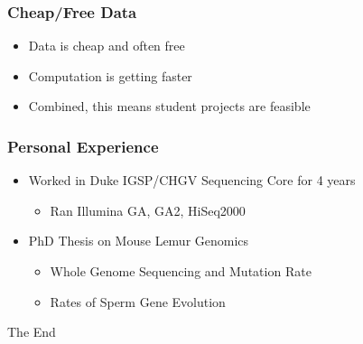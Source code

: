 \documentclass[14pt]{beamer}
\begin{document}
\begin{frame}
\frametitle{Cheap/Free Data}
\begin{itemize}
	\item Data is cheap and often free
	\item Computation is getting faster
	\item Combined, this means student projects are feasible
\end{itemize}
\end{frame}
\begin{frame}
\frametitle{Personal Experience}
\begin{itemize}
	\item Worked in Duke IGSP/CHGV Sequencing Core for 4 years
	\begin{itemize}
		\item Ran Illumina GA, GA2, HiSeq2000
	\end{itemize}
	\item PhD Thesis on Mouse Lemur Genomics
	\begin{itemize}
		\item Whole Genome Sequencing and Mutation Rate
		\item Rates of Sperm Gene Evolution
	\end{itemize}
\end{itemize}
\end{frame}

\begin{frame}
\Huge{\centerline{The End}}
\end{frame}

\end{document}
